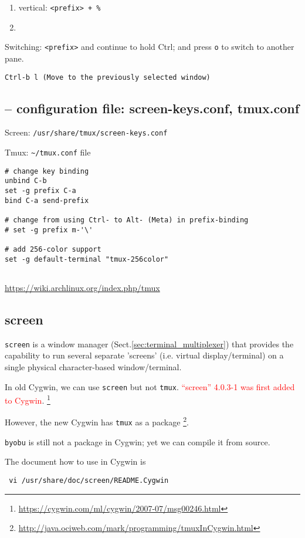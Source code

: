 \begin{enumerate}
  \item vertical: \verb!<prefix> + %!
  
  \item 
\end{enumerate}


Switching: \verb!<prefix>! and continue to hold Ctrl; and press \verb!o! to
switch to another pane.
\begin{verbatim}
Ctrl-b l (Move to the previously selected window)
\end{verbatim}


\subsection{-- configuration file: screen-keys.conf, tmux.conf}
\label{sec:tmux.conf}
\label{sec:screen-keys.conf}

Screen: \verb!/usr/share/tmux/screen-keys.conf!

Tmux: \verb!~/tmux.conf! file
\begin{verbatim}
# change key binding
unbind C-b
set -g prefix C-a
bind C-a send-prefix

# change from using Ctrl- to Alt- (Meta) in prefix-binding
# set -g prefix m-'\'

# add 256-color support
set -g default-terminal "tmux-256color" 


\end{verbatim}
\url{https://wiki.archlinux.org/index.php/tmux}

\subsection{screen}
\label{sec:screen}

\verb!screen! is a window manager (Sect.\ref{sec:terminal_multiplexer}) that
provides the capability to run several separate 'screens' (i.e. virtual
display/terminal) on a single physical character-based window/terminal.

\begin{mdframed}

In old Cygwin, we can use \verb!screen! but not \verb!tmux!. 
\textcolor{red}{``screen'' 4.0.3-1 was first added to Cygwin}.
\footnote{\url{https://cygwin.com/ml/cygwin/2007-07/msg00246.html}}

However, the new Cygwin has \verb!tmux! as a package
\footnote{\url{http://java.ociweb.com/mark/programming/tmuxInCygwin.html}}.

\verb!byobu! is still not a package in Cygwin; yet we can compile it from
source. 

The document how to use in Cygwin is
\begin{verbatim}
 vi /usr/share/doc/screen/README.Cygwin 
\end{verbatim}

\end{mdframed}


